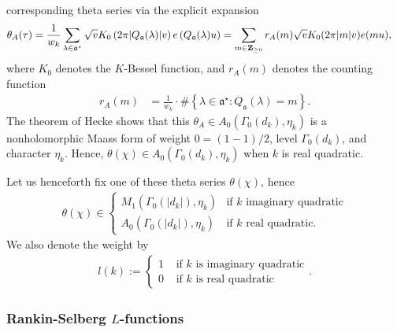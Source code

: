 \documentclass{amsart}
\theoremstyle{definition}
\theoremstyle{definition}
\theoremstyle{definition}
\begin{document}
corresponding theta series via the explicit expansion 
\begin{align*} \theta_A(\tau) &= \frac{1}{w_k}\sum\limits_{\lambda \in \mathfrak{a}^{\star}}  \sqrt{v} K_0 \left( 2 \pi \vert Q_{\mathfrak{a}}(\lambda) \vert v \right) 
e \left( Q_{\mathfrak{a}}(\lambda) u \right)
= \sum\limits_{m \in {\bf{Z}}_{\geq 0}} r_A(m) \sqrt{v} K_0(2 \pi \vert m \vert v) e(m u), \end{align*}
where $K_0$ denotes the $K$-Bessel function, and $r_A(m)$ denotes the counting function 
\begin{align*} r_A(m) &= \frac{1}{w_k} \cdot \# \left \lbrace \lambda \in \mathfrak{a}^{\star}: Q_{\mathfrak{a}}(\lambda) = m \right\rbrace. \end{align*}
The theorem of Hecke shows that this $\theta_A \in A_0(\Gamma_0(d_k ), \eta_k)$ 
is a nonholomorphic Maass form of weight $0 = (1-1)/2$, level $\Gamma_0( d_k )$, and character $\eta_k$. 
Hence, $\theta(\chi) \in A_0(\Gamma_0(d_k), \eta_k)$ when $k$ is real quadratic. 

Let us henceforth fix one of these theta series $\theta(\chi)$, hence 
\begin{equation}\begin{aligned}\label{Hecketheta} \theta(\chi) \in \begin{cases} M_{1}(\Gamma_0(\vert d_k \vert), \eta_k) &\text{if $k$ imaginary quadratic}\\
A_0(\Gamma_0(\vert d_k \vert), \eta_k) &\text{if $k$ real quadratic}.\end{cases}\end{aligned}\end{equation}
We also denote the weight by 
\begin{align}\label{weight} l(k) := \begin{cases} 1 &\text{ if $k$ is imaginary quadratic} \\
0 &\text{ if $k$ is real quadratic} \end{cases}. \end{align}

\subsubsection{Rankin-Selberg $L$-functions}
\end{document}

